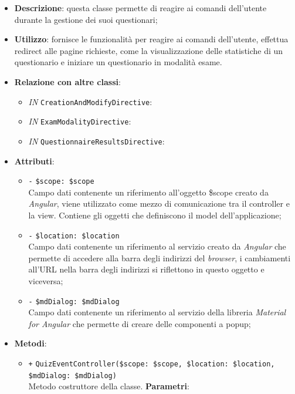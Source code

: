 \begin{itemize}
	\item \textbf{Descrizione}: questa classe permette di reagire ai comandi dell'utente durante la gestione dei suoi questionari;
	\item \textbf{Utilizzo}: fornisce le funzionalità per reagire ai comandi dell'utente, effettua redirect alle pagine richieste, come la visualizzazione delle statistiche di un questionario e iniziare un questionario in modalità esame.
	\item \textbf{Relazione con altre classi}:
	\begin{itemize}
		\item \textit{IN} \texttt{CreationAndModifyDirective}:  
		\item \textit{IN} \texttt{ExamModalityDirective}:
		\item \textit{IN} \texttt{QuestionnaireResultsDirective}:
	\end{itemize}
	\item \textbf{Attributi}:
	\begin{itemize}
		\item \texttt{-} \texttt{\$scope: \$scope} \\
		Campo dati contenente un riferimento all’oggetto \$scope creato da \textit{Angular}, viene utilizzato come mezzo di comunicazione tra il controller e la view. Contiene gli oggetti che definiscono il model dell’applicazione;
		\item \texttt{-} \texttt{\$location: \$location} \\
		Campo dati contenente un riferimento al servizio creato da \textit{Angular} che permette di accedere alla barra degli indirizzi del \textit{browser}, i cambiamenti all’URL nella barra degli indirizzi si riflettono in questo oggetto e viceversa;
		\item \texttt{-} \texttt{\$mdDialog: \$mdDialog} \\
		Campo dati contenente un riferimento al servizio della libreria \textit{Material for Angular} che permette di creare delle componenti a popup;
	\end{itemize}
	\item \textbf{Metodi}:
	\begin{itemize}
		\item \texttt{+} \texttt{QuizEventController(\$scope: \$scope, \$location: \$location, \$mdDialog: \$mdDialog)} \\ Metodo costruttore della classe.
		\textbf{Parametri}:
		\begin{itemize}

\end{itemize}
\end{itemize}
\end{itemize}
